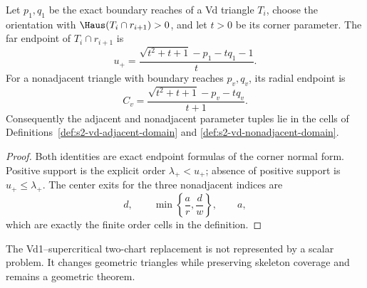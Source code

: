 \begin{proposition}
\label{prop:s2-vd-corner-bridge}
Let \(p_1,q_1\) be the exact boundary reaches of a Vd triangle $T_i$, choose
the orientation with $\Haus(T_i\cap r_{i+1})>0$, and let \(t>0\) be its
corner parameter.  The far endpoint of $T_i\cap r_{i+1}$ is
\[
 u_+=\frac{\sqrt{t^2+t+1}-p_1-tq_1-1}{t}.
\]
For a nonadjacent triangle with boundary reaches \(p_v,q_v\), its radial
endpoint is
\[
 C_v=\frac{\sqrt{t^2+t+1}-p_v-tq_v}{t+1}.
\]
Consequently the adjacent and nonadjacent parameter tuples lie in the cells of
Definitions~\ref{def:s2-vd-adjacent-domain} and
\ref{def:s2-vd-nonadjacent-domain}.
\end{proposition}

\begin{proof}
Both identities are exact endpoint formulas of the corner normal form.
Positive support is the explicit order
\(\lambda_+<u_+\); absence of positive support is \(u_+\le\lambda_+\).
The center exits for the three nonadjacent indices are
\[
 d,\qquad \min\left\{\frac ar,\frac dw\right\},\qquad a,
\]
which are exactly the finite order cells in the definition.
\end{proof}

\begin{remark}
The Vd1--supercritical two-chart replacement is not represented by a scalar
problem.  It changes geometric triangles while preserving skeleton coverage and
remains a geometric theorem.
\end{remark}

